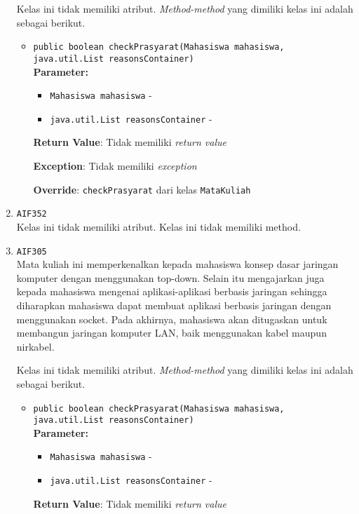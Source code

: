 \documentclass{article}
\begin{document}
\begin{enumerate}
Kelas ini tidak memiliki atribut. \textit{Method-method} yang dimiliki kelas ini adalah sebagai berikut.
\begin{itemize}
\item \texttt{public boolean checkPrasyarat(Mahasiswa mahasiswa, java.util.List reasonsContainer)}\\ 


\textbf{Parameter:}\begin{itemize}
\item \texttt{Mahasiswa mahasiswa} - 
\item \texttt{java.util.List reasonsContainer} - 
\end{itemize}
\textbf{Return Value}: Tidak memiliki \textit{return value}

\textbf{Exception}: Tidak memiliki \textit{exception}

\textbf{Override}: \texttt{checkPrasyarat} dari kelas \texttt{MataKuliah}

\end{itemize}
\item \texttt{AIF352}\\ 


Kelas ini tidak memiliki atribut. Kelas ini tidak memiliki method. \item \texttt{AIF305}\\ 
Mata kuliah ini memperkenalkan kepada mahasiswa konsep dasar jaringan
 komputer dengan menggunakan top-down. Selain itu mengajarkan juga kepada
 mahasiswa mengenai aplikasi-aplikasi berbasis jaringan sehingga diharapkan
 mahasiswa dapat membuat aplikasi berbasis jaringan dengan menggunakan socket.
 Pada akhirnya, mahasiswa akan ditugaskan untuk membangun jaringan komputer
 LAN, baik menggunakan kabel maupun nirkabel.

Kelas ini tidak memiliki atribut. \textit{Method-method} yang dimiliki kelas ini adalah sebagai berikut.
\begin{itemize}
\item \texttt{public boolean checkPrasyarat(Mahasiswa mahasiswa, java.util.List reasonsContainer)}\\ 


\textbf{Parameter:}\begin{itemize}
\item \texttt{Mahasiswa mahasiswa} - 
\item \texttt{java.util.List reasonsContainer} - 
\end{itemize}
\textbf{Return Value}: Tidak memiliki \textit{return value}


\end{itemize}
\end{enumerate}
\end{document}
